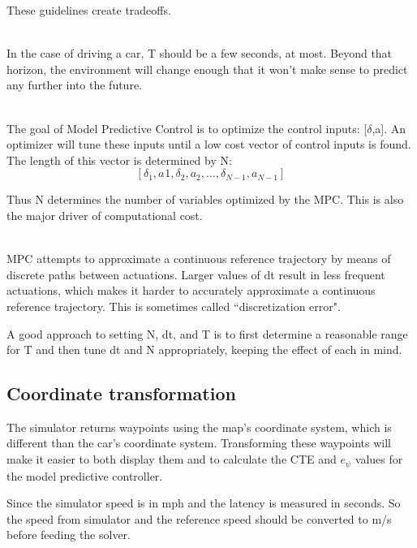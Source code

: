 These guidelines create tradeoffs.

 \\
In the case of driving a car, T should be a few seconds, at most. Beyond that horizon, the environment will change enough that it won't make sense to predict any further into the future.

 \\
The goal of Model Predictive Control is to optimize the control inputs: [$\delta$,a]. An optimizer will tune these inputs until a low cost vector of control inputs is found. The length of this vector is determined by N:
\[
  [\delta_1,a_​1, \delta_2,a_2,\ldots,\delta_{N−1},a_{​N−1}]
​​\]

Thus N determines the number of variables optimized by the MPC. This is also the major driver of computational cost.

 \\
MPC attempts to approximate a continuous reference trajectory by means of discrete paths between actuations. Larger values of dt result in less frequent actuations, which makes it harder to accurately approximate a continuous reference trajectory. This is sometimes called ``discretization error".

A good approach to setting N, dt, and T is to first determine a reasonable range for T and then tune dt and N appropriately, keeping the effect of each in mind.

\subsection{Coordinate transformation}
The simulator returns waypoints using the map's coordinate system, which is different than the car's coordinate system. Transforming these waypoints will make it easier to both display them and to calculate the CTE and $e_{\psi}$ values for the model predictive controller.

Since the simulator speed is in mph and the latency is measured in seconds. So the speed from simulator and the reference speed should be converted to m/s before feeding the solver.

